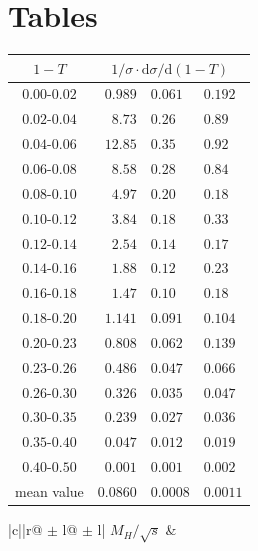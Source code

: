 \documentclass[12pt,a4paper,twoside]{article}
\begin{document}
%
\clearpage
\section*{ Tables }

\begin{table}[!htb]
\begin{center}
%
%
\begin{tabular}{|c||r@{ $\pm$ }l@{ $\pm$ }l|}   
\hline
$1-T$           & 
      \multicolumn{3}{c|}{$1/\sigma \cdot {\mathrm{d}}\sigma/{\mathrm{d}}(1-T)$} \\
\hline\hline
$ 0.00 $-$0.02  $&$   0.989 $&$     0.061 $&$     0.192   $\\
$ 0.02 $-$0.04  $&$   8.73  $&$     0.26  $&$     0.89    $\\
$ 0.04 $-$0.06  $&$  12.85  $&$     0.35  $&$     0.92    $\\
$ 0.06 $-$0.08  $&$   8.58  $&$     0.28  $&$     0.84    $\\
$ 0.08 $-$0.10  $&$   4.97  $&$     0.20  $&$     0.18    $\\
$ 0.10 $-$0.12  $&$   3.84  $&$     0.18  $&$     0.33    $\\
$ 0.12 $-$0.14  $&$   2.54  $&$     0.14  $&$     0.17    $\\
$ 0.14 $-$0.16  $&$   1.88  $&$     0.12  $&$     0.23    $\\
$ 0.16 $-$0.18  $&$   1.47  $&$     0.10  $&$     0.18    $\\
$ 0.18 $-$0.20  $&$   1.141 $&$     0.091 $&$     0.104   $\\
$ 0.20 $-$0.23  $&$   0.808 $&$     0.062 $&$     0.139   $\\
$ 0.23 $-$0.26  $&$   0.486 $&$     0.047 $&$     0.066   $\\
$ 0.26 $-$0.30  $&$   0.326 $&$     0.035 $&$     0.047   $\\
$ 0.30 $-$0.35  $&$   0.239 $&$     0.027 $&$     0.036   $\\
$ 0.35 $-$0.40  $&$   0.047 $&$     0.012 $&$     0.019   $\\
$ 0.40 $-$0.50  $&$   0.001 $&$     0.001 $&$     0.002   $\\
\hline\hline
mean value       &$  0.0860 $&$     0.0008 $&$    0.0011 $\\
\hline
\end{tabular}
%
%
\begin{tabular}{|c||r@{ $\pm$ }l@{ $\pm$ }l|}   
\hline
$M_H/\sqrt{s}$           & 
\end{tabular}
\end{center}
\end{table}
\end{document}
